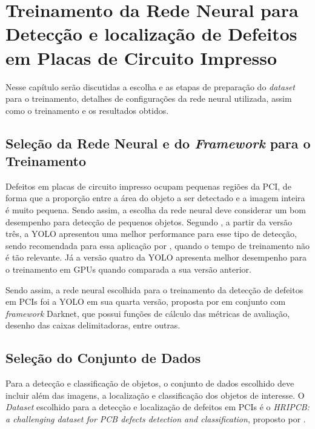 \chapter{Treinamento da Rede Neural para Detecção e localização de Defeitos em Placas de Circuito Impresso} \label{cap:treinamento}
Nesse capítulo serão discutidas a escolha e as etapas de preparação do \textit{dataset} para o treinamento, detalhes de configurações da rede neural utilizada, assim como o treinamento e os resultados obtidos.

\section{Seleção da Rede Neural e do \textit{Framework} para o Treinamento} \label{cap:treinamento-rn}

Defeitos em placas de circuito impresso ocupam pequenas regiões da PCI, de forma que a proporção entre a área do objeto a ser detectado e a imagem inteira é muito pequena. Sendo assim, a escolha da rede neural deve considerar um bom desempenho para detecção de pequenos objetos. Segundo , a partir da versão três, a YOLO apresentou uma melhor performance para esse tipo de detecção, sendo recomendada para essa aplicação por , quando o tempo de treinamento não é tão relevante. Já a versão quatro da YOLO apresenta melhor desempenho para o treinamento em GPUs quando comparada a sua versão anterior.

Sendo assim, a rede neural escolhida para o treinamento da detecção de defeitos em PCIs foi a YOLO em sua quarta versão, proposta por  em conjunto com \textit{framework} Darknet, que possui funções de cálculo das métricas de avaliação, desenho das caixas delimitadoras, entre outras.

\section{Seleção do Conjunto de Dados} \label{cap:treinamento-dataset}

Para a detecção e classificação de objetos, o conjunto de dados escolhido deve incluir além das imagens, a localização e classificação dos objetos de interesse.
O \textit{Dataset} escolhido para a detecção e localização de defeitos em PCIs é o \textit{HRIPCB: a challenging dataset for PCB defects detection and classification}, proposto por .

